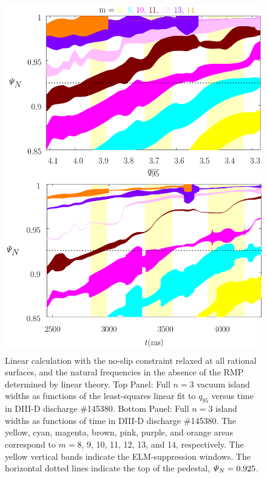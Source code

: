 \documentclass[12pt,prb,aps]{revtex4-1}
\begin{document}
\begin{figure}
\includegraphics[height=6in]{fig8.pdf}
\caption{Linear calculation with the no-slip constraint relaxed at all rational surfaces, and  the natural frequencies
in the absence of the RMP determined by linear theory. Top Panel: Full  $n=3$ vacuum island widths as functions of the least-squares linear fit to $q_{95}$ versus time 
in   DIII-D discharge \#145380.
Bottom Panel:  Full $n=3$ island widths as functions of time
in   DIII-D discharge \#145380. The yellow, cyan, magenta, brown, pink,
purple, and orange  areas correspond to $m=8$, 9, 10, 11, 12, 13, and 14, respectively. The yellow vertical bands indicate the ELM-suppression windows. 
The horizontal dotted lines indicate the top of the pedestal, ${\mit\Psi}_N=0.925$.} \label{fig8}
\end{figure}
\end{document}
